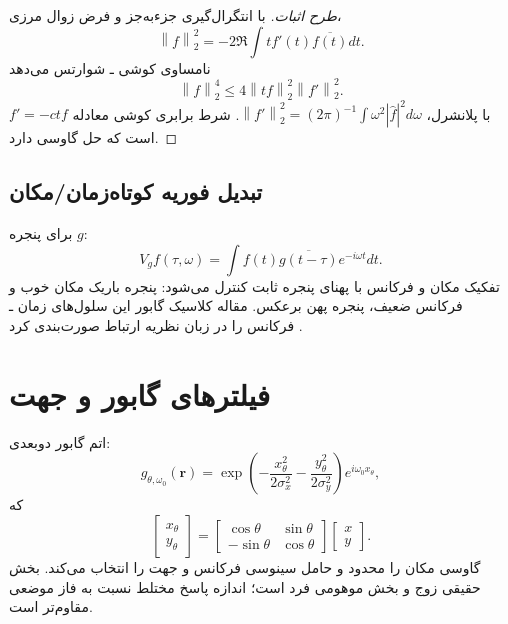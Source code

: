 \documentclass[12pt,openany,oneside]{book}
\newcommand{\norm}[1]{\left\lVert #1\right\rVert}
\newcommand{\vect}[1]{\bm{#1}}
\begin{document}
\begin{proof}[طرح اثبات]
با انتگرال‌گیری جزءبه‌جز و فرض زوال مرزی،
\begin{equation}
\norm f_2^2=-2\Re\int t f'(t)\overline{f(t)}dt.
\end{equation}
نامساوی کوشی ـ شوارتس می‌دهد
\begin{equation}
\norm f_2^4\le4\norm{tf}_2^2\norm{f'}_2^2.
\end{equation}
با پلانشرل، \(\norm{f'}_2^2=(2\pi)^{-1}\int\omega^2|\widehat f|^2d\omega\). شرط برابری کوشی
معادله \(f'=-ctf\) است که حل گاوسی دارد.
\end{proof}

\subsection{تبدیل فوریه کوتاه‌زمان/مکان}
برای پنجره \(g\):
\begin{equation}
V_gf(\tau,\omega)=\int f(t)\overline{g(t-\tau)}e^{-i\omega t}dt.
\end{equation}
تفکیک مکان و فرکانس با پهنای پنجره ثابت کنترل می‌شود: پنجره باریک مکان خوب و فرکانس ضعیف، پنجره پهن
برعکس. مقاله کلاسیک گابور این سلول‌های زمان ـ فرکانس را در زبان نظریه ارتباط صورت‌بندی کرد
\cite{gabor1946communication}.

\section{فیلترهای گابور و جهت}

اتم گابور دوبعدی:
\begin{equation}
g_{\theta,\omega_0}(\vect r)
=\exp\left(-\frac{x_\theta^2}{2\sigma_x^2}-\frac{y_\theta^2}{2\sigma_y^2}\right)
 e^{i\omega_0x_\theta},
\end{equation}
که
\begin{equation}
\begin{bmatrix}x_\theta\\y_\theta\end{bmatrix}
=\begin{bmatrix}\cos\theta&\sin\theta\\-\sin\theta&\cos\theta\end{bmatrix}
\begin{bmatrix}x\\y\end{bmatrix}.
\end{equation}
گاوسی مکان را محدود و حامل سینوسی فرکانس و جهت را انتخاب می‌کند. بخش حقیقی زوج و بخش موهومی فرد است؛
اندازه پاسخ مختلط نسبت به فاز موضعی مقاوم‌تر است.
\end{document}
